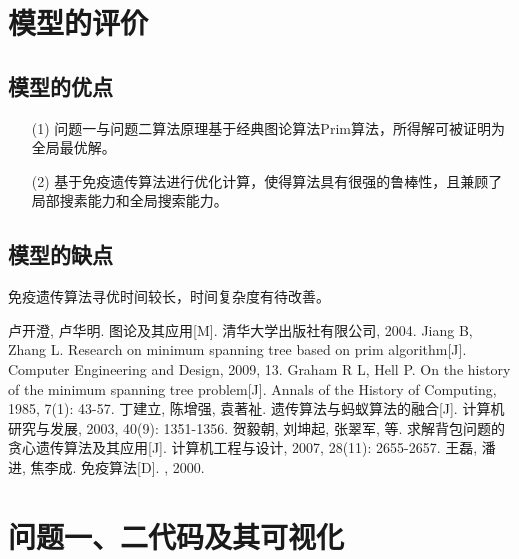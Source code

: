\documentclass{whutmod}
\begin{document}
  	\section{模型的评价}
		\subsection{模型的优点}
		\begin{itemize}                                             
			\item [(1)]问题一与问题二算法原理基于经典图论算法Prim算法，所得解可被证明为全局最优解。
			\item [(2)] 基于免疫遗传算法进行优化计算，使得算法具有很强的鲁棒性，且兼顾了局部搜素能力和全局搜索能力。
		\end{itemize}
		\subsection{模型的缺点}
		免疫遗传算法寻优时间较长，时间复杂度有待改善。


  
  
 
	\newpage	%
	\nocite{*}		%
	\begin{thebibliography}{9}%
		卢开澄, 卢华明. 图论及其应用[M]. 清华大学出版社有限公司, 2004.
		Jiang B, Zhang L. Research on minimum spanning tree based on prim algorithm[J]. Computer Engineering and Design, 2009, 13.
		Graham R L, Hell P. On the history of the minimum spanning tree problem[J]. Annals of the History of Computing, 1985, 7(1): 43-57.
		丁建立, 陈增强, 袁著祉. 遗传算法与蚂蚁算法的融合[J]. 计算机研究与发展, 2003, 40(9): 1351-1356.
		贺毅朝, 刘坤起, 张翠军, 等. 求解背包问题的贪心遗传算法及其应用[J]. 计算机工程与设计, 2007, 28(11): 2655-2657.
		王磊, 潘进, 焦李成. 免疫算法[D]. , 2000.
	\end{thebibliography}

	\newpage
	\appendix %
	\section{问题一、二代码及其可视化}
\end{document}
